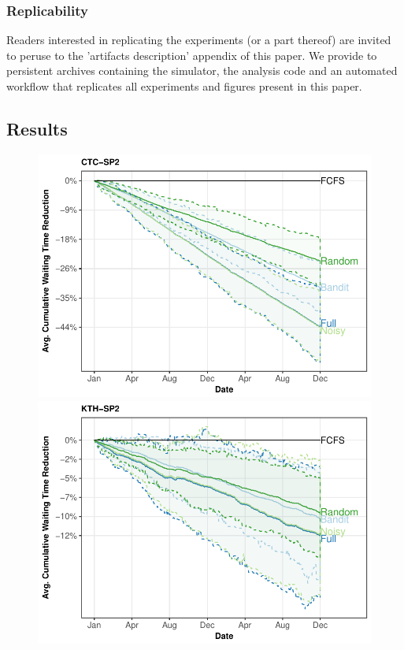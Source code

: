 \documentclass[sigconf]{acmart}
\begin{document}
\subsubsection{Replicability}

Readers interested in replicating the experiments (or a part thereof) are
invited to peruse to the 'artifacts description' appendix of this paper.  We
provide to persistent archives containing the simulator, the analysis code
and an automated workflow that replicates all experiments and figures
present in this paper.

\subsection{Results}
\label{sub:results}

\begin{figure}[h]
  \centering
  \includegraphics[scale=0.6]{figures/CTC-SP2.pdf}
  \includegraphics[scale=0.6]{figures/KTH-SP2.pdf}\\

\end{figure}
\end{document}
